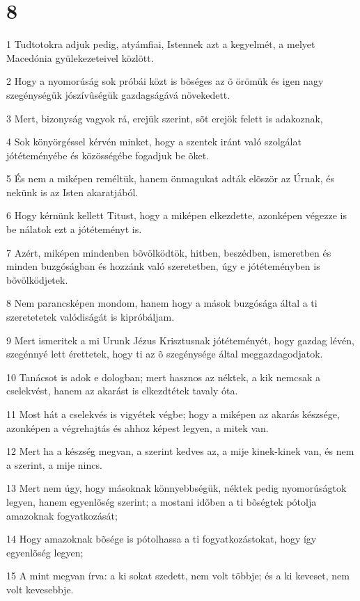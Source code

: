 \chapter{8}

\par 1 Tudtotokra adjuk pedig, atyámfiai, Istennek azt a kegyelmét, a melyet Macedónia gyülekezeteivel közlött.
\par 2 Hogy a nyomorúság sok próbái közt is bõséges az õ örömük és igen nagy szegénységük jószívûségük gazdagságává növekedett.
\par 3 Mert, bizonyság vagyok rá, erejük szerint, sõt erejök felett is adakoznak,
\par 4 Sok könyörgéssel kérvén minket, hogy a szentek iránt való szolgálat jótéteményébe és közösségébe fogadjuk be õket.
\par 5 És nem a miképen reméltük, hanem önmagukat adták elõször az Úrnak, és nekünk is az Isten akaratjából.
\par 6 Hogy kérnünk kellett Titust, hogy a miképen elkezdette, azonképen végezze is be nálatok ezt a jótéteményt is.
\par 7 Azért, miképen mindenben bõvölködtök, hitben, beszédben, ismeretben és minden buzgóságban és hozzánk való szeretetben, úgy e jótéteményben is bõvölködjetek.
\par 8 Nem parancsképen mondom, hanem hogy a mások buzgósága által a ti szeretetetek valódiságát is kipróbáljam.
\par 9 Mert ismeritek a mi Urunk Jézus Krisztusnak jótéteményét, hogy gazdag lévén, szegénnyé lett érettetek, hogy ti  az õ szegénysége által meggazdagodjatok.
\par 10 Tanácsot is adok e dologban; mert hasznos az néktek, a kik nemcsak a cselekvést, hanem az akarást is elkezdtétek tavaly óta.
\par 11 Most hát a cselekvés is vigyétek végbe; hogy a miképen az akarás készsége,  azonképen a végrehajtás és ahhoz képest legyen, a mitek van.
\par 12 Mert ha a készség megvan, a szerint kedves az, a mije kinek-kinek van, és nem a szerint, a mije nincs.
\par 13 Mert nem úgy, hogy másoknak könnyebbségük, néktek pedig nyomorúságtok legyen, hanem egyenlõség szerint; a mostani idõben a ti bõségtek pótolja amazoknak fogyatkozását;
\par 14 Hogy amazoknak bõsége is pótolhassa a ti fogyatkozástokat, hogy így egyenlõség legyen;
\par 15 A mint megvan írva: a ki sokat szedett, nem volt többje; és a ki keveset, nem volt kevesebbje.

